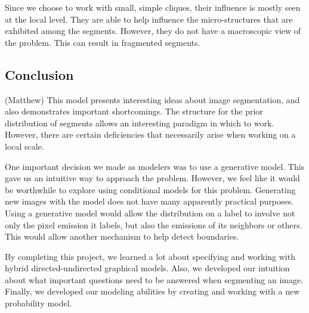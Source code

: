 \documentclass[12pt]{article}
\begin{document}
Since we choose to work with small, simple cliques, their influence is mostly
seen at the local level. They are able to help influence the micro-structures
that are exhibited among the segments. However, they do not have a macroscopic
view of the problem. This can result in fragmented segments.

\subsection*{Conclusion} (Matthew)
This model presents interesting ideas about image segmentation, and also
demonstrates important shortcomings. The structure for the prior distribution
of segments allows an interesting paradigm in which to work. However, there are
certain deficiencies that necessarily arise when working on a local scale.

One important decision we made as modelers was to use a generative model. This
gave us an intuitive way to approach the problem. However, we feel like it
would be worthwhile to explore using conditional models for this problem.
Generating new images with the model does not have many apparently practical
purposes. Using a generative model would allow the distribution on a label to
involve not only the pixel emission it labels, but also the emissions of its
neighbors or others. This would allow another mechanism to help detect
boundaries.

By completing this project, we learned a lot about specifying and working with
hybrid directed-undirected graphical models. Also, we developed our intuition
about what important questions need to be answered when segmenting an image.
Finally, we developed our modeling abilities by creating and working with a new
probability model.
\end{document}
